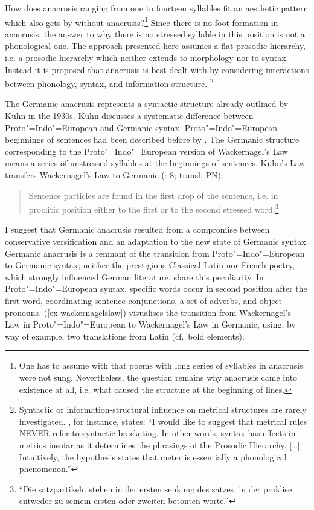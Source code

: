 \documentclass[output=paper
  ,nobabel
  ,uniformtopskip %
]{langscibook}
\begin{document}
\noindent
How does anacrusis ranging from one to fourteen syllables fit an aesthetic pattern which also gets by without anacrusis?\footnote{One has to assume with \citet*[§216]{Heusler1925} that poems with long series of syllables in anacrusis were not sung. Nevertheless, the question remains why anacrusis came into existence at all, i.e. what caused the structure at the beginning of lines.} Since there is no foot formation in anacrusis, the answer to why there is no stressed syllable in this position is not a phonological one. The approach presented here assumes a flat prosodic hierarchy, i.e. a prosodic hierarchy which neither extends to morphology nor to syntax. Instead it is proposed that anacrusis is best dealt with by considering interactions between phonology, syntax, and information structure.%
%
\footnote{Syntactic or information-structural influence on metrical structures are rarely investigated. \citet[224]{Hayes1989}, for instance, states: ``I would like to suggest that metrical rules NEVER refer to syntactic bracketing. In other words, syntax has effects in metrics insofar as it determines the phrasings of the Prosodic Hierarchy. [\ldots] Intuitively, the hypothesis states that meter is essentially a phonological phenomenon.''}

The Germanic anacrusis represents a syntactic structure already outlined by Kuhn in the 1930s. Kuhn discusses a systematic difference between Proto"=Indo"=European and Germanic syntax. Proto"=Indo"=European beginnings of sentences had been described before by \citet{Wackernagel1892}. The Germanic structure corresponding to the Proto"=Indo"=European version of Wackernagel's Law means a series of unstressed syllables at the beginnings of sentences. Kuhn's Law transfers Wackernagel's Law to Germanic (\citealt{Kuhn1933}: 8; transl. PN):

\begin{quote}
Sentence particles are found in the first drop of the sentence, i.e. in proclitic position either to the first or to the second stressed word.\footnote{``{Die satzpartikeln stehen in der ersten senkung des satzes, in der proklise entweder zu seinem ersten oder zweiten betonten worte.''}}
\end{quote}
\largerpage
\noindent
I suggest that Germanic anacrusis resulted from a compromise between conservative versification and
an adaptation to the new state of Germanic syntax. Germanic anacrusis is a remnant of the transition
from Proto"=Indo"=European to Germanic syntax; neither the prestigious Classical Latin nor French poetry, which strongly influenced German literature, share this peculiarity. In Proto"=Indo"=European syntax, specific words occur in second position after the first word, \eg coordinating sentence conjunctions, a set of adverbs, and object pronouns. (\ref{ex-wackernagelslaw}) visualises the transition from Wackernagel's Law in Proto"=Indo"=European to Wackernagel's Law in Germanic, using, by way of example, two translations from Latin (cf.\ bold elements).
\end{document}
